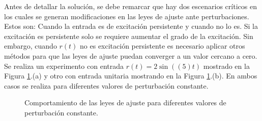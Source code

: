 \documentclass[letterpaper,11pt]{article} %
\begin{document}
Antes de detallar la solución, se debe remarcar que hay dos escenarios críticos en los cuales se generan modificaciones en las leyes de ajuste ante perturbaciones. Estos son: Cuando la entrada es de excitación persistente y cuando no lo es. Si la excitación es persistente solo se requiere aumentar el grado de la excitación. Sin embargo, cuando $r(t)$ no es excitación persistente es necesario aplicar otros métodos para que las leyes de ajuste puedan converger a un valor cercano a cero. Se realiza un experimento con entrada $r(t) = 2\sin((5)t)$ mostrado en la Figura \ref{estado1}.(a) y otro con entrada unitaria mostrando en la Figura \ref{estado1}.(b). En  ambos casos se realiza para diferentes valores de perturbación constante.\\
\begin{figure}[h]
	\centering
	\captionsetup{justification=centering}
	\caption{Comportamiento de las leyes de ajuste para diferentes valores de perturbación constante.}
	\label{estado1}
\end{figure}
\end{document}
